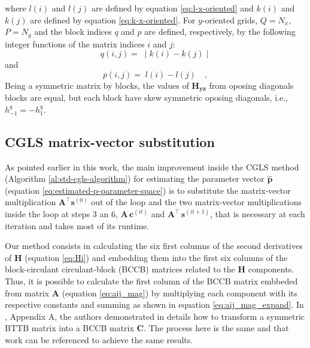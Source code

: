 where $l(i)$ and $l(j)$ are defined by equation \ref{eq:l-x-oriented} 
and $k(i)$ and $k(j)$ are defined by equation \ref{eq:k-x-oriented}.
For $y$-oriented grids, $Q = N_{x}$, $P = N_{y}$ and the block indices
$q$ and $p$ are defined, respectively, by the following integer functions 
of the matrix indices $i$ and $j$:
\begin{equation}
	q(i, j) = \; \mid k(i) - k(j) \mid
	\label{eq:Hyz-q-y-oriented}
\end{equation}
and
\begin{equation}
	p(i, j) = \; l(i) - l(j) \quad ,
	\label{eq:Hyz-p-y-oriented}
\end{equation}
Being a symmetric matrix by blocks, the values of $\mathbf{H_{yz}}$ from oposing diagonals blocks are equal, but each block have skew symmetric oposing diagonals, i.e., $h^{q}_{-1} = - h^{q}_{1}$.

\subsection{CGLS matrix-vector substitution}

As pointed earlier in this work, the main improvement inside the CGLS method (Algorithm \ref{al:std-cgls-algorithm}) for estimating the parameter vector $\hat{\mathbf{p}}$ (equation \ref{eq:estimated-p-parameter-space}) is to substitute the matrix-vector multiplication $\mathbf{A}^{\top} \mathbf{s}^{(0)}$ out of the loop and the two matrix-vector multiplications inside the loop at steps 3 an 6, $\mathbf{A} \, \mathbf{c}^{(it)}$ and $\mathbf{A}^{\top} \, \mathbf{s}^{(it + 1)}$, that is necessary at each iteration and takes most of its runtime.

Our method consists in calculating the six first columns of the second derivatives of $\mathbf{H}$ (equation \ref{eq:Hi}) and embedding them into the first six columns of the block-circulant circulant-block (BCCB) matrices related to the $\mathbf{H}$ components. Thus, it is possible to calculate the first column of the BCCB matrix embbeded from matrix $\mathbf{A}$ (equation \ref{eq:aij_mag}) by multiplying each component with its respective constants and summing as shown in equation \ref{eq:aij_mag_expand}. In \cite{takahashi2020convolutional}, Appendix A, the authors demonstrated in details how to transform a symmetric BTTB matrix into a BCCB matrix $\mathbf{C}$. The process here is the same and that work can be referenced to achieve the same results.

